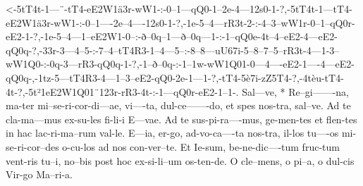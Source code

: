   {<-5tT4t-1---¨-tT4-eE2W1ä3r-wW1-:-0--1---qQ0-1--2e-4---12s0-1-?,-5tT4t-1---tT4-eE2W1ä3r-wW1-:-0--1----2e--4----12s0-1-?,-1e-5--4---rR3t-2-:-4--3--wW1r-0--1--qQ0r-eE2-1-?,-1e-5--4---1--eE2W1-0--:-ð--0q--1---ð--0q---1-:-1--qQ0e-4t--4--eE2-4---eE2-qQ0q-?,-33r-3---4--5-:-7--4--tT4R3-1--4---5--:-8--8---uU67i-5--8--7--5--rR3t-4---1-3--wW1Q0-:-0q-3---rR3-qQ0q-1-?,-1--ð--0q-:-1--1w-wW1Q01-0---4----eE2-1----4---eE2-qQ0q-,-1tz-5---tT4R3-4---1--3--eE2-qQ0-2e-1---1-?,-tT4-5è7i-zZ5T4-?,-4tèu-tT4-4t-?,-5t²1eE2W1Q01¨123r-rR3-4t-:-1---qQ0r-eE2-1--1-.}
  {  Sal---ve, * Re--gi-------na,   ma-ter mi--se-ri-cor-di---ae,  vi----ta, dul-ce-------do,   et spes nos-tra, sal--ve.  Ad te cla-ma---mus ex-su-les  fi-li-i    E---vae. Ad te sus-pi-ra----mus, ge-men-tes et flen-tes in hac  lac-ri-ma--rum val-le.     E---ia, er-go, ad-vo-ca----ta nos-tra, il-los tu----os mi-se-ri-cor--des o-cu-los     ad nos con-ver--te.  Et Ie-sum, be-ne-dic----tum fruc-tum vent-ris tu--i,     no--bis post  hoc ex-si-li--um  os-ten-de.  O   cle--mens,    o    pi--a,    o                 dul-cis  Vir-go   Ma--ri-a.}

